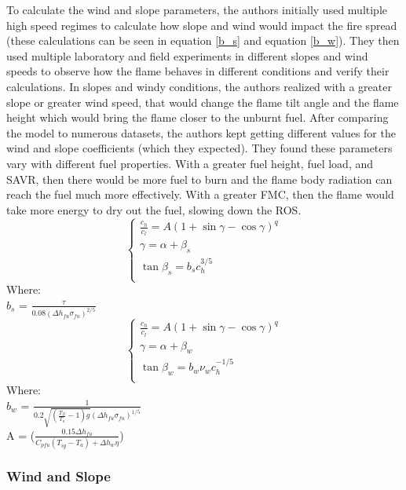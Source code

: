 \documentclass{article}
\begin{document}
To calculate the wind and slope parameters, the authors initially used multiple high speed regimes to calculate how slope and wind would impact the fire spread (these calculations can be seen in equation \ref{b_s} and equation \ref{b_w}). They then used multiple laboratory and field experiments in different slopes and wind speeds to observe how the flame behaves in different conditions and verify their calculations. In slopes and windy conditions, the authors realized with a greater slope or greater wind speed, that would change the flame tilt angle and the flame height which would bring the flame closer to the unburnt fuel. After comparing the model to numerous datasets, the authors kept getting different values for the wind and slope coefficients (which they expected). They found these parameters vary with different fuel properties. With a greater fuel height, fuel load, and SAVR, then there would be more fuel to burn and the flame body radiation can reach the fuel much more effectively. With a greater FMC, then the flame would take more energy to dry out the fuel, slowing down the ROS. 
\begin{equation}
\label{b_s}
	\begin{cases} \frac{c_h}{c_l} = A(1 + \sin \gamma - \cos \gamma)^q\\
	\gamma = \alpha + \beta _s \\
	\tan \beta _s = b_s c_h ^{3/5} \\
	 \end{cases}
\end{equation}
Where: \\
$b_s$ = $\frac {\tau} {0.08 (\Delta h_{fu} \sigma _{fu})^{2/5}}$
\begin{equation}
\label{b_w}
\begin{cases}
	\frac{c_h}{c_l} = A(1 + \sin \gamma - \cos \gamma)^q\\
	\gamma = \alpha + \beta _w \\
	\tan \beta _w = b_w \nu _w c_h ^{-1/5} \\
\end{cases}
\end{equation}
Where: \\
$b_w$ = $\frac {1} {0.2 \sqrt{(\frac{T_{fl}}{T_a} - 1)g}(\Delta h_{fu} \sigma _{fu})^{1/5}}$ \\

\noindent A = ($\frac {0.15 \Delta h_{fu}}{C_{pfu} (T_{ig} - T_a) + \Delta h_w \eta}$)
\subsubsection{Wind and Slope}
\end{document}
